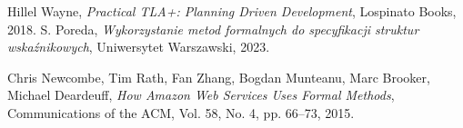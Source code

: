 \documentclass[conference]{IEEEtran}
\begin{document}
\begin{thebibliography}{00}
            Hillel Wayne, \emph{Practical TLA+: Planning Driven Development}, Lospinato Books, 2018.
            S. Poreda,
            \textit{Wykorzystanie metod formalnych do specyfikacji struktur wskaźnikowych},
            Uniwersytet Warszawski, 2023.

            Chris Newcombe, Tim Rath, Fan Zhang, Bogdan Munteanu, Marc Brooker, Michael Deardeuff, \emph{How Amazon Web Services Uses Formal Methods}, Communications of the ACM, Vol. 58, No. 4, pp. 66--73, 2015.

        \end{thebibliography}
\end{document}

